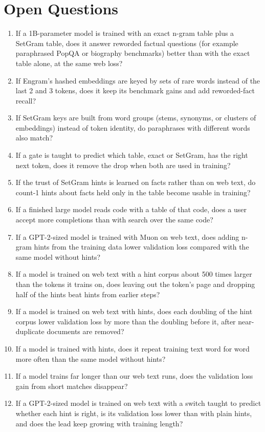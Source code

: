 \documentclass[11pt]{article}
\begin{document}
\section{Open Questions}
\begin{enumerate}
\item If a 1B-parameter model is trained with an exact n-gram table plus a SetGram table, does it answer reworded factual questions (for example paraphrased PopQA or biography benchmarks) better than with the exact table alone, at the same web loss?
\item If Engram's hashed embeddings are keyed by sets of rare words instead of the last 2 and 3 tokens, does it keep its benchmark gains and add reworded-fact recall?
\item If SetGram keys are built from word groups (stems, synonyms, or clusters of embeddings) instead of token identity, do paraphrases with different words also match?
\item If a gate is taught to predict which table, exact or SetGram, has the right next token, does it remove the drop when both are used in training?
\item If the trust of SetGram hints is learned on facts rather than on web text, do count-1 hints about facts held only in the table become usable in training?
\item If a finished large model reads code with a table of that code, does a user accept more completions than with search over the same code?
\item If a GPT-2-sized model is trained with Muon on web text, does adding n-gram hints from the training data lower validation loss compared with the same model without hints?
\item If a model is trained on web text with a hint corpus about 500 times larger than the tokens it trains on, does leaving out the token's page and dropping half of the hints beat hints from earlier steps?
\item If a model is trained on web text with hints, does each doubling of the hint corpus lower validation loss by more than the doubling before it, after near-duplicate documents are removed?
\item If a model is trained with hints, does it repeat training text word for word more often than the same model without hints?
\item If a model trains far longer than our web text runs, does the validation loss gain from short matches disappear?
\item If a GPT-2-sized model is trained on web text with a switch taught to predict whether each hint is right, is its validation loss lower than with plain hints, and does the lead keep growing with training length?

\end{enumerate}
\end{document}
